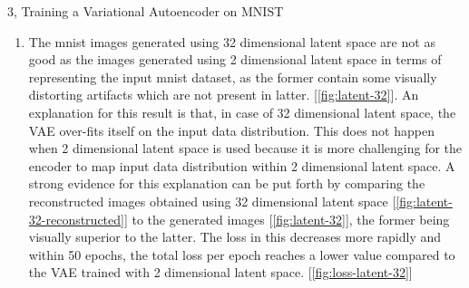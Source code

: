 \documentclass[10pt,a4paper]{article}
\begin{document}
\begin{task}{3, Training a Variational Autoencoder on MNIST}
\begin{enumerate}
	\item The mnist images generated using 32 dimensional latent space are not as good as the images generated using 2 dimensional latent space in terms of representing the input mnist dataset, as the former contain some visually distorting artifacts which are not present in latter. [\ref{fig:latent-32}]. An explanation for this result is that, in case of 32 dimensional latent space, the VAE over-fits itself on the input data distribution. This does not happen when 2 dimensional latent space is used because it is more challenging for the encoder to map input data distribution within 2 dimensional latent space. A strong evidence for this explanation can be put forth by comparing the reconstructed images obtained using 32 dimensional latent space [\ref{fig:latent-32-reconstructed}] to the generated images [\ref{fig:latent-32}], the former being visually superior to the latter. The loss in this decreases more rapidly and within 50 epochs, the total loss per epoch reaches a lower value compared to the VAE trained with 2 dimensional latent space. [\ref{fig:loss-latent-32}]


\end{enumerate}
\end{task}
\end{document}
